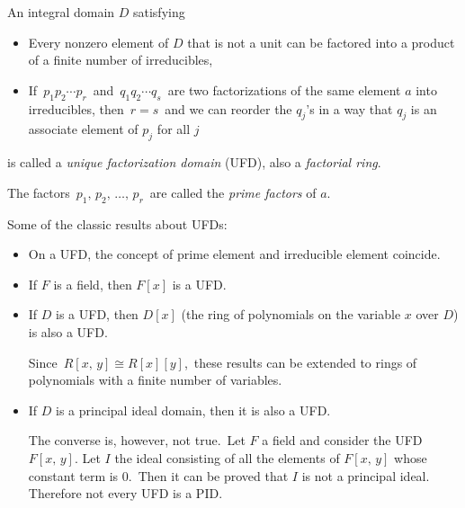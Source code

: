 \documentclass[12pt]{article}
\begin{document}
An integral domain $D$ satisfying
\begin{itemize}
\item Every nonzero element of $D$ that is not a unit can be factored into a product of a finite number of irreducibles,
\item If\, $p_1p_2\cdots p_r$\, and\, $q_1q_2\cdots q_s$\, are two factorizations of the same element $a$ into irreducibles, then\, $r = s$\, and we can reorder the $q_j$'s in a way that $q_j$ is an associate  element of $p_j$ for all $j$
\end{itemize}
is called a \emph{unique factorization domain} (UFD), also a {\em factorial ring}.

The factors\, $p_1,\,p_2,\,\ldots,\,p_r$\, are called the {\em prime factors} of $a$.

Some of the classic results about UFDs:
\begin{itemize}
\item {On a UFD, the concept of prime element and irreducible element coincide.}

\item {If $F$ is a field, then $F[x]$ is a UFD.}

\item If $D$ is a UFD, then $D[x]$ (the ring of polynomials on the variable $x$ over $D$) is also a UFD.

Since\, $R[x,\,y]\cong R[x][y]$,\, these results can be extended to rings of polynomials with a finite number of variables.

\item If $D$ is a principal ideal domain, then it is also a UFD.

The converse is, however, not true.\, Let $F$ a field and consider the UFD $F[x,\,y]$.
Let $I$ the ideal consisting of all the elements of $F[x,\,y]$ whose constant term  is $0$.\, Then it can be proved that $I$ is not a principal ideal.\, Therefore not every  UFD is a PID.
\end{itemize}
\end{document}
